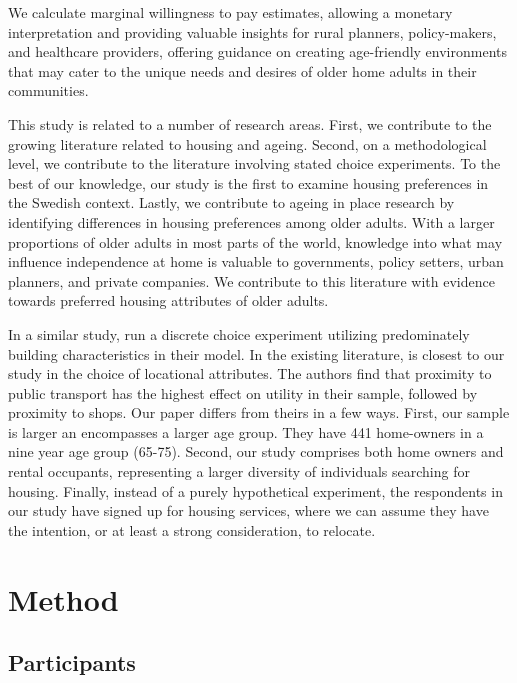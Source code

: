 \documentclass[3p,11pt ]{elsarticle}
\begin{document}
We calculate marginal willingness to pay estimates,
allowing a monetary interpretation and providing valuable insights for rural planners, policy-makers, and healthcare providers, offering guidance on creating age-friendly environments that may cater to the unique needs and desires of older home adults in their communities.


This study is related to a number of research areas.
First,
we contribute to the growing literature related to housing and ageing.
Second,
on a methodological level, we contribute to the literature involving stated choice experiments.
To the best of our knowledge,
our study is the first to examine housing preferences in the Swedish context.
Lastly,
we contribute to ageing in place research by identifying differences in housing preferences among older adults.
With a larger proportions of older adults in most parts of the world,
knowledge into what may influence independence at home is valuable to governments, policy setters, urban planners, and private companies.
We contribute to this literature with evidence towards preferred housing attributes of older adults.


In a similar study,
\cite{ossokinaBestLivingConcepts2020} 
run a discrete choice experiment utilizing predominately building characteristics in their model.
In the existing literature,
\cite{ossokinaReferencedependentHousingChoice2022a} is closest to our study in the choice of locational attributes.
The authors find that proximity to public transport has the highest effect on utility in their sample, followed by proximity to shops.
Our paper differs from theirs in a few ways.
First,
our sample is larger an encompasses a larger age group.
They have 441 home-owners in a nine year age group (65-75).
Second,
our study comprises both home owners and rental occupants, representing a larger diversity of individuals searching for housing.
Finally,
instead of a purely hypothetical experiment, the respondents in our study have signed up for housing services, where we can assume they have the intention, or at least a strong consideration, to relocate.





\section{Method}

\subsection{Participants}
\end{document}

